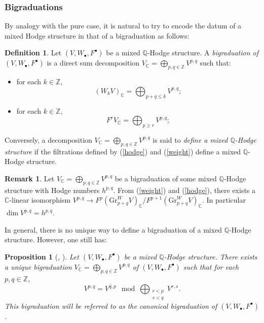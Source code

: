 \documentclass[10pt]{article}
\numberwithin{equation}{subsection}
\theoremstyle{plain}
\newtheorem{proposition}[theorem]{Proposition}
\theoremstyle{definition}
\newtheorem{definition}[theorem]{Definition}
\newtheorem{remark}[theorem]{Remark}
\theoremstyle{remark}
\newcommand{\Z}{\mathbb Z}
\newcommand{\Q}{\mathbb Q}
\newcommand{\C}{\mathbb C}
\newcommand{\bul}{\bullet}
\newcommand{\Gr}{\mathrm{Gr}}
\begin{document}
\subsubsection*{Bigraduations}
By analogy with the pure case, it is natural to try to encode the datum of a mixed Hodge structure in that of a bigraduation as follows:
\begin{definition}
Let $(V, W_\bul, F^\bul)$ be a mixed $\Q$-Hodge structure. A \textit{bigraduation of $(V,W_\bul, F^\bul)$} is a direct sum decomposition $V_\C = \bigoplus_{p,q \in \Z} V^{p,q}$ such that:
\begin{itemize}
\item for each $k \in \Z$, 
\begin{equation}\label{weight}(W_k V)_\C = \bigoplus_{p+q \leqslant k} V^{p,q}; \end{equation}
\item for each $k \in \Z$, 
\begin{equation}\label{hodge} F^r V_\C = \bigoplus_{p \geqslant r} V^{p,q}; \end{equation}
\end{itemize}
Conversely, a decomposition $V_\C = \bigoplus_{p,q \in \Z} V^{p,q}$ is said to \textit{define a mixed $\Q$-Hodge structure} if the filtrations defined by (\ref{hodge}) and (\ref{weight}) define a mixed $\Q$-Hodge structure.
\end{definition}
\begin{remark}
Let $V_\C = \bigoplus_{p,q \in \Z} V^{p,q}$ be a bigraduation of some mixed $\Q$-Hodge structure with Hodge numbers $h^{p,q}$. From (\ref{weight}) and (\ref{hodge}), there exists a $\C$-linear isomorphism $V^{p,q} \rightarrow F^p (\Gr^W_{p+q}V)_\C/F^{p+1}(\Gr^W_{p+q}V)_\C$. In particular $\dim V^{p,q} = h^{p,q}$.
\end{remark}
In general, there is no unique way to define a bigraduation of a mixed $\Q$-Hodge structure. However, one still has:
\begin{proposition}[{\cite[Prop. 1.2.8]{hodge2}, \cite[Prop. 2.2]{klingao}}]\label{delbigrad}
Let $(V, W_\bul, F^\bul)$ be a mixed $\Q$-Hodge structure. There exists a unique bigraduation $V_\C = \bigoplus_{p,q \in \Z} V^{p,q}$ of $(V, W_\bul, F^\bul)$ such that for each $p,q \in \Z$,
\begin{equation}\label{conj}
V^{p,q} = \overline{V^{q,p}} \mod \bigoplus_{\substack{r < p \\ s < q}} V^{r,s}.
\end{equation}
This bigraduation will be referred to as \textit{the canonical bigraduation} of $(V,W_\bul,F^\bul)$.
\end{proposition}
\end{document}
